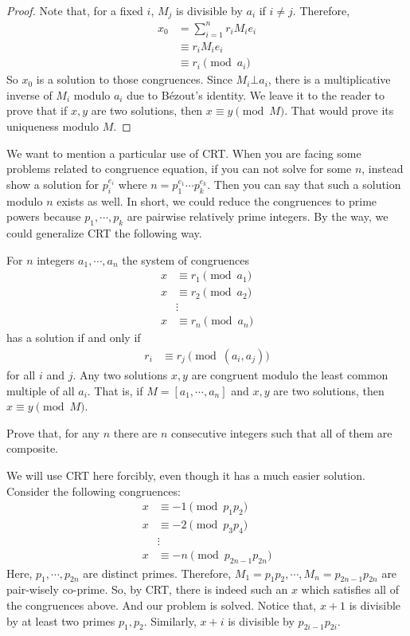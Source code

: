 	\begin{proof}
		Note that, for a fixed $i$, $M_j$ is divisible by $a_i$ if $i\neq j$. Therefore,
		\begin{align*}
		x_0
			& = \sum_{i=1}^{n} r_i M_ie_i\\
			& \equiv r_iM_ie_i\\
			& \equiv r_i\pmod{a_i}
		\end{align*}
		So $x_0$ is a solution to those congruences. Since $M_i\bot a_i$, there is a multiplicative inverse of $M_i$ modulo $a_i$ due to B\'{e}zout's identity. We leave it to the reader to prove that if $x,y$ are two solutions, then $x\equiv y\pmod M$. That would prove its uniqueness modulo $M$.
	\end{proof}
We want to mention a particular use of CRT. When you are facing some problems related to congruence equation, if you can not solve for some $n$, instead show a solution for $p_i^{e_i}$ where $n=p_1^{e_1}\cdots p_k^{e_k}$. Then you can say that such a solution modulo $n$ exists as well. In short, we could reduce the congruences to prime powers because $p_1,\cdots,p_k$ are pairwise relatively prime integers. By the way, we could generalize CRT the following way.
	\begin{theorem}
		For $n$ integers $a_1,\cdots,a_n$ the system of congruences
		\begin{align*}
			x & \equiv r_1\pmod{a_1}\\
			x & \equiv r_2\pmod{a_2}\\
			&\vdots\\
			x & \equiv r_n\pmod{a_n}
		\end{align*}
		has a solution if and only if
		\begin{align*}
			r_i & \equiv r_j\pmod{(a_i,a_j)}
		\end{align*}
		for all $i$ and $j$. Any two solutions $x,y$ are congruent modulo the least common multiple of all $a_i$. That is, if $M=[a_1,\cdots,a_n]$ and $x,y$ are two solutions, then $x\equiv y\pmod M$.
	\end{theorem}

	\begin{problem}
		Prove that, for any $n$ there are $n$ consecutive integers such that all of them are composite.
	\end{problem}

	\begin{solution}
		We will use CRT here forcibly, even though it has a much easier solution. Consider the following congruences:
			\begin{align*}
				x & \equiv -1\pmod{p_1p_2}\\
				x & \equiv -2\pmod{p_3p_4}\\
		  & \vdots \\
				x & \equiv -n\pmod{p_{2n-1}p_{2n}}
			\end{align*}
		Here, $p_1,\cdots,p_{2n}$ are distinct primes. Therefore, $M_1=p_1p_2,\cdots,M_n=p_{2n-1}p_{2n}$ are pair-wisely co-prime. So, by CRT, there is indeed such an $x$ which satisfies all of the congruences above. And our problem is solved. Notice that, $x+1$ is divisible by at least two primes $p_1,p_2$. Similarly, $x+i$ is divisible by $p_{2i-1}p_{2i}$.
	\end{solution}

